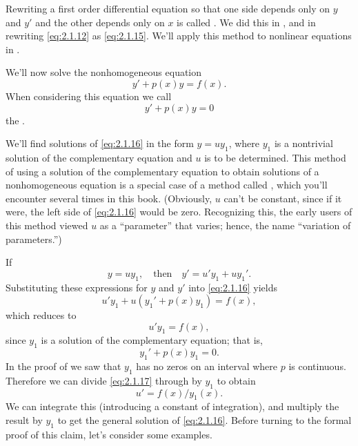 \begin{remark*}
Rewriting a first order differential equation so that one
side depends only on $y$ and $y'$ and the other depends only on $x$
is called
.
We did this in
, and in rewriting
\eqref{eq:2.1.12} as \eqref{eq:2.1.15}. We'll apply this method to nonlinear
equations in .
\end{remark*}


We'll now solve the nonhomogeneous equation
\begin{equation}\label{eq:2.1.16}
y'+p(x)y=f(x).
\end{equation}
When considering this equation  we call
\[
y'+p(x)y=0
\]
the .

We'll find solutions of \eqref{eq:2.1.16} in the form $y=uy_1$, where
$y_1$ is a nontrivial solution of the complementary equation and $u$
is to be determined. This method of using a solution of the
complementary equation to obtain solutions of a nonhomogeneous
equation is a special case of a method called , which you'll encounter several times in this book.
(Obviously, $u$ can't be constant, since if it were, the left side
of \eqref{eq:2.1.16} would be zero. Recognizing this, the early users of
this method viewed $u$ as a ``parameter'' that varies; hence, the name
``variation of parameters.'')

If
\[
y=uy_1,\quad\text{then}\quad y'=u'y_1+uy_1'.
\]
Substituting these expressions for $y$ and $y'$ into \eqref{eq:2.1.16}
yields
\[
u'y_1+u(y_1'+p(x)y_1)=f(x),
\]
which reduces to
\begin{equation}\label{eq:2.1.17}
u'y_1=f(x),
\end{equation}
since $y_1$ is a solution of the complementary equation; that is,
\[
y_1'+p(x)y_1=0.
\]
In the proof of  we saw that $y_1$
has no zeros on an interval where $p$ is continuous. Therefore
we can divide \eqref{eq:2.1.17} through by $y_1$ to obtain
\[
u'=f(x)/y_1(x).
\]
We can integrate this (introducing a constant of integration), and
multiply  the result by $y_1$ to get the general solution of
\eqref{eq:2.1.16}.
Before turning to the formal proof of this claim, let's consider
some examples.

